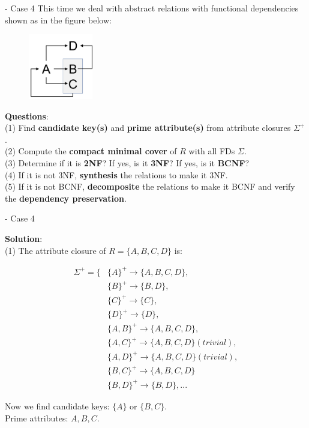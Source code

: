 \begin{frame}[fragile]{ - Case 4}
	This time we deal with abstract relations with functional dependencies shown as in the figure below:\\\vspace{-5pt}
	
	\begin{figure}
		\includegraphics[width=0.25\textwidth, trim=0 0 0 0, clip]{t5/images/case4.png}
	\end{figure}\vspace{-5pt}

	\textbf{Questions}:\\
	(1) Find \textbf{candidate key(s)} and \textbf{prime attribute(s)} from attribute closures $\Sigma^{+}$.\\
	(2) Compute the \textbf{compact minimal cover} of $R$ with all FDs $\Sigma$.\\
	(3) Determine if it is \textbf{2NF}? If yes, is it \textbf{3NF}? If yes, is it \textbf{BCNF}?\\
	(4) If it is not 3NF, \textbf{synthesis} the relations to make it 3NF.\\
	(5) If it is not BCNF, \textbf{decomposite} the relations to make it BCNF and verify the \textbf{dependency preservation}. 
\end{frame}


\begin{frame}[fragile]{ - Case 4}
	
	\textbf{Solution}:\\
	(1) The attribute closure of $R = \{A, B, C, D\}$ is:\\\vspace{5pt}
	\begin{scriptsize}
		\begin{align*} 
			\Sigma^{+} = \{&\{A\}^{+} \rightarrow \{A, B, C, D\},\\
			&\{B\}^{+} \rightarrow \{B, D\},\\
			&\{C\}^{+} \rightarrow \{C\},\\
			&\{D\}^{+} \rightarrow \{D\},\\
			&\{A, B\}^{+} \rightarrow \{A, B, C, D\},\\
			&\{A, C\}^{+} \rightarrow \{A, B, C, D\} (trivial),\\
			&\{A, D\}^{+} \rightarrow \{A, B, C, D\} (trivial),\\
			&\{B, C\}^{+} \rightarrow \{A, B, C, D\}\\
			&\{B, D\}^{+} \rightarrow \{B, D\}, ...
		\end{align*}
	\end{scriptsize}
	
	Now we find candidate keys: $\{A\}$ or $\{B, C\}$.\\
	Prime attributes: $A, B, C$.
\end{frame}

